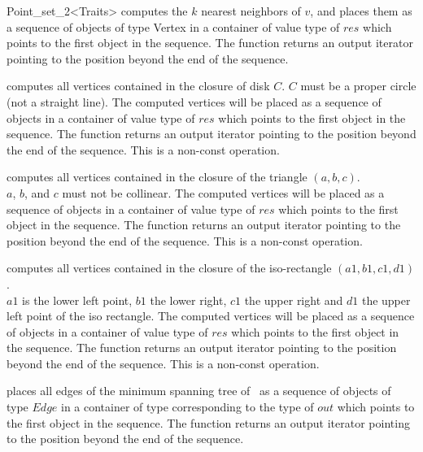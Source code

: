 \begin{ccRefClass}{Point_set_2<Traits>}
{ computes the $k$ nearest neighbors of $v$, and places them as a sequence of objects of type
Vertex in a container of value type of $res$
which points to the first object in the sequence. The function
returns an output iterator pointing to the position beyond the end
of the sequence. }

{ computes all vertices contained in the closure of disk $C$.
\ccPrecond $C$ must be a proper circle (not a straight line). 
The computed vertices will be placed as a sequence of objects in a container of value type
of $res$
which points to the first object in the sequence. The function
returns an output iterator pointing to the position beyond the end
of the sequence.
This is a non-const operation.}

{ computes all vertices contained in the closure of the triangle $(a,b,c)$.\\
\ccPrecond $a$, $b$, and $c$ must not be collinear. 
The computed vertices will be placed as a sequence of objects in a container of value type
of $res$
which points to the first object in the sequence. The function
returns an output iterator pointing to the position beyond the end
of the sequence.
This is a non-const operation.}

{ computes all vertices contained in the closure of the iso-rectangle $(a1,b1,c1,d1)$.\\
\ccPrecond $a1$ is the lower left point, $b1$ the lower right, $c1$ the upper
right and $d1$ the upper left point of the iso rectangle.
The computed vertices will be placed as a sequence of objects in a container of value type
of $res$
which points to the first object in the sequence. The function
returns an output iterator pointing to the position beyond the end
of the sequence.
This is a non-const operation.}

{ places all edges of the minimum spanning tree of \ccVar\ as a sequence of objects of type
$Edge$ in a container of type corresponding to the type of $out$
which points to the first object in the sequence. The function
returns an output iterator pointing to the position beyond the end
of the sequence.}


\end{ccRefClass}
